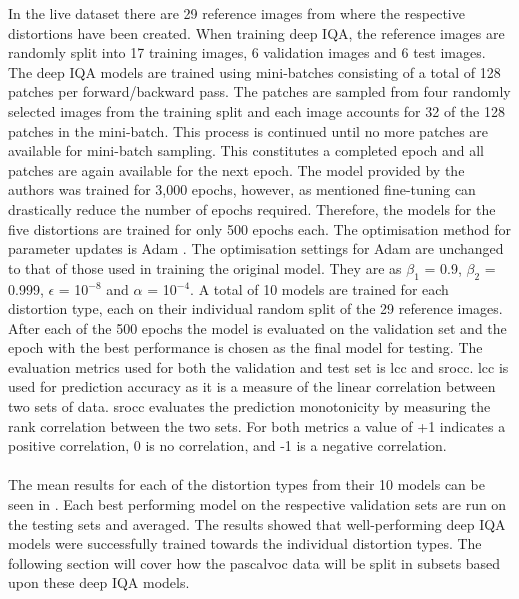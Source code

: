 \documentclass[a4paper,twoside]{article}
\begin{document}
In the \gls{live} dataset there are 29 reference images from where the respective distortions have been created. When training deep IQA, the reference images are randomly split into 17 training images, 6 validation images and 6 test images. The deep IQA models are trained using mini-batches consisting of a total of 128 patches per forward/backward pass. The patches are sampled from four randomly selected images from the training split and each image accounts for 32 of the 128 patches in the mini-batch. This process is continued until no more patches are available for mini-batch sampling. This constitutes a completed epoch and all patches are again available for the next epoch. The model provided by the authors was trained for 3,000 epochs, however, as mentioned fine-tuning can drastically reduce the number of epochs required. Therefore, the models for the five distortions are trained for only 500 epochs each. The optimisation method for parameter updates is Adam \cite{adam}. The optimisation settings for Adam are unchanged to that of those used in training the original model. They are as $\beta_1$ = 0.9, $\beta_2$ = 0.999, $\epsilon$ = 10$^{-8}$ and $\alpha$ = 10$^{-4}$. A total of 10 models are trained for each distortion type, each on their individual random split of the 29 reference images. After each of the 500 epochs the model is evaluated on the validation set and the epoch with the best performance is chosen as the final model for testing. The evaluation metrics used for both the validation and test set is \gls{lcc} and \gls{srocc}. \gls{lcc} is used for prediction accuracy as it is a measure of the linear correlation between two sets of data. \gls{srocc} evaluates the prediction monotonicity by measuring the rank correlation between the two sets. For both metrics a value of +1 indicates a positive correlation, 0 is no correlation, and -1 is a negative correlation.
\\\\
The mean results for each of the distortion types from their 10 models can be seen in . Each best performing model on the respective validation sets are run on the testing sets and averaged. The results showed that well-performing deep IQA models were successfully trained towards the individual distortion types. The following section will cover how the \gls{pascalvoc} data will be split in subsets based upon these deep IQA models.
\end{document}
